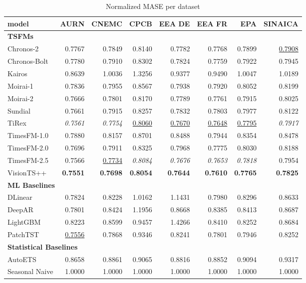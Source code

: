 \begin{table}[H]
\caption{Normalized MASE per dataset}
\centering
\begin{small}
\begin{tabular}{lrrrrrrr}
\toprule
model & AURN & CNEMC & CPCB & EEA DE & EEA FR & EPA & SINAICA \\
\midrule
\multicolumn{8}{l}{\textbf{TSFMs}} \\
Chronos-2 & 0.7767 & 0.7849 & 0.8140 & 0.7782 & 0.7768 & 0.7899 & \underline{0.7908} \\
Chronos-Bolt & 0.7780 & 0.7910 & 0.8302 & 0.7824 & 0.7759 & 0.7922 & 0.7945 \\
Kairos & 0.8639 & 1.0036 & 1.3256 & 0.9377 & 0.9490 & 1.0047 & 1.0189 \\
Moirai-1 & 0.7836 & 0.7955 & 0.8567 & 0.7938 & 0.7920 & 0.8052 & 0.8199 \\
Moirai-2 & 0.7666 & 0.7801 & 0.8170 & 0.7789 & 0.7761 & 0.7915 & 0.8025 \\
Sundial & 0.7661 & 0.7915 & 0.8257 & 0.7832 & 0.7803 & 0.7977 & 0.8122 \\
TiRex & \textit{0.7561} & \textit{0.7754} & \underline{0.8060} & \underline{0.7670} & \underline{0.7648} & \underline{0.7795} & \textit{0.7917} \\
TimesFM-1.0 & 0.7880 & 0.8157 & 0.8701 & 0.8488 & 0.7944 & 0.8354 & 0.8478 \\
TimesFM-2.0 & 0.7696 & 0.7911 & 0.8325 & 0.7968 & 0.7775 & 0.8030 & 0.8188 \\
TimesFM-2.5 & 0.7566 & \underline{0.7734} & \textit{0.8084} & \textit{0.7676} & \textit{0.7653} & \textit{0.7818} & 0.7954 \\
VisionTS++ & \textbf{0.7551} & \textbf{0.7698} & \textbf{0.8054} & \textbf{0.7644} & \textbf{0.7610} & \textbf{0.7765} & \textbf{0.7825} \\
\midrule
\multicolumn{8}{l}{\textbf{ML Baselines}} \\
DLinear & 0.7824 & 0.8228 & 1.0162 & 1.1431 & 0.7980 & 0.8296 & 0.8633 \\
DeepAR & 0.7801 & 0.8424 & 1.1956 & 0.8668 & 0.8385 & 0.8413 & 0.8687 \\
LightGBM & 0.8223 & 0.8599 & 0.9457 & 1.4266 & 0.8410 & 0.8252 & 0.8684 \\
PatchTST & \underline{0.7556} & 0.7868 & 0.9346 & 0.8241 & 0.7801 & 0.7946 & 0.8252 \\
\midrule
\multicolumn{8}{l}{\textbf{Statistical Baselines}} \\
AutoETS & 0.8658 & 0.8861 & 0.9065 & 0.8816 & 0.8852 & 0.9094 & 0.9317 \\
Seasonal Naive & 1.0000 & 1.0000 & 1.0000 & 1.0000 & 1.0000 & 1.0000 & 1.0000 \\
\bottomrule
\end{tabular}
\end{small}
\end{table}